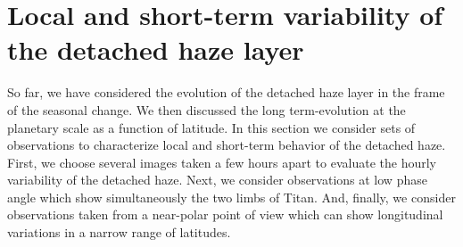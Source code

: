 \section{Local and short-term variability of the detached haze layer}

So far, we have considered the evolution of the detached haze layer in the frame of the seasonal change.
We then discussed the long term-evolution at the planetary scale as a function of latitude.
In this section we consider sets of observations to characterize local and short-term
behavior of the detached haze. First, we choose several images taken a few hours apart to
evaluate the hourly variability of the detached haze. Next, we consider
observations at low phase angle which show simultaneously the two limbs of Titan. And, finally,
we consider observations taken from a near-polar point of view which can show
longitudinal variations in a narrow range of latitudes.



